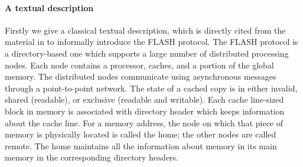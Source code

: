 \documentclass{llncs-new}
\newcommand{\bedt}[1]{{\color{black}#1}}
\begin{document}
\paragraph*{A textual description}Firstly we give a classical textual description, which is directly cited from the material in \cite{Park2000} to informally introduce the FLASH protocol. The FLASH protocol  is a directory-based one which supports a large number of distributed processing nodes. Each node contains a processor, caches, and
a portion of the global memory. The distributed nodes communicate using asynchronous
messages through a point-to-point network. The state of a cached copy is in either invalid,
shared (readable), or exclusive (readable and writable). Each cache line-sized block in memory is associated with directory header which keeps information about the \bedt{cache} line.  For a memory \bedt{address}, the
node on which that piece of memory is physically located is called the home; the other
nodes are called remote. The home maintains all the information about memory in
its main memory in the corresponding directory headers.
\end{document}
